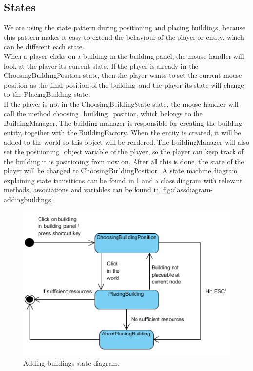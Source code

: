 \subsection{States}
We are using the state pattern during positioning and placing buildings, because this pattern makes it easy to extend the behaviour of the player or entity, which can be different each state.\\
When a player clicks on a building in the building panel, the mouse handler will look at the player its current state. If the player is already in the ChoosingBuildingPosition state, then the player wants to 
set the current mouse position as the final position of the building, and the player its state will change to the  PlacingBuilding state.\\
If the player is not in the ChoosingBuildingState state, the mouse  handler will call the method 
choosing\_building\_position, which belongs to the BuildingManager. The building manager is responsible for creating the building entity, together with the BuildingFactory.
When the entity is created, it will be added to the world so this object will be rendered.
The BuildingManager will also set the positioning\_object variable of the player, so the player can keep track of the building it is positioning from now on. After all this is done, the state of the player will be changed to ChoosingBuildingPosition.
A state machine diagram explaining state transitions can be found in \cref{fig:statediagram-addingbuildings} and a class diagram with relevant methods, associations and variables can be found in \cref{fig:classdiagram-addingbuildings}.

\begin{figure}[H]
    \centering
    \includegraphics{res/adding-buildings/States-StateDiagram.png}
    \caption{Adding buildings state diagram.}\label{fig:statediagram-addingbuildings}
\end{figure}

